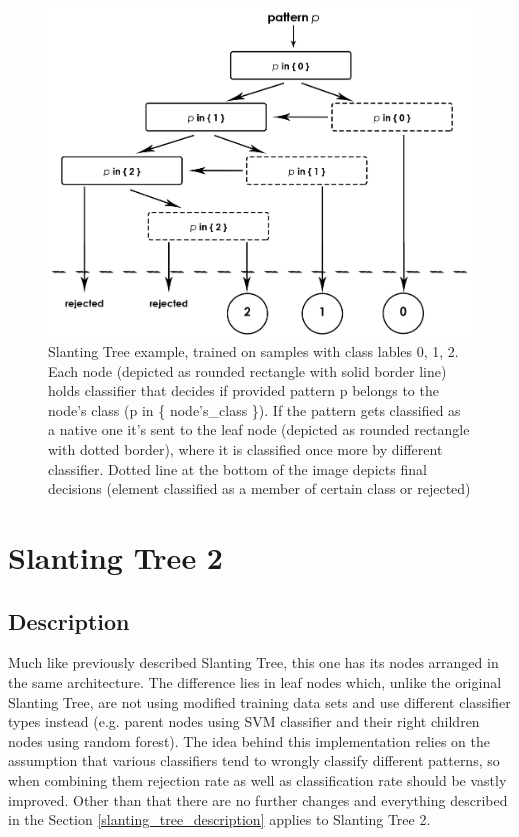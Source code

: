 \begin{figure}[!t]
	\centering
	\includegraphics[width=1\textwidth]{Figures/slanting_tree.jpg}
	\caption{Slanting Tree example, trained on samples with class lables 0, 1, 2. Each node (depicted as rounded rectangle with solid border line) holds classifier that decides if provided pattern p belongs to the node's class (p in \{ node's\_class \}). If the pattern gets classified as a native one it's sent to the leaf node (depicted as rounded rectangle with dotted border), where it is classified once more by different classifier. Dotted line at the bottom of the image depicts final decisions (element classified as a member of certain class or rejected)}
	\label{fig:rejection_version2}\vspace{-3pt}
\end{figure}

\section{Slanting Tree 2}

\subsection{Description}

Much like previously described Slanting Tree, this one has its nodes arranged in the same architecture. The difference lies in leaf nodes which, unlike the original Slanting Tree, are not using modified training data sets and use different classifier types instead (e.g. parent nodes using SVM classifier and their right children nodes using random forest). The idea behind this implementation relies on the assumption that various classifiers tend to wrongly classify different patterns, so when combining them rejection rate as well as classification rate should be vastly improved. Other than that there are no further changes and everything described in the Section \ref{slanting_tree_description} applies to Slanting Tree 2.

